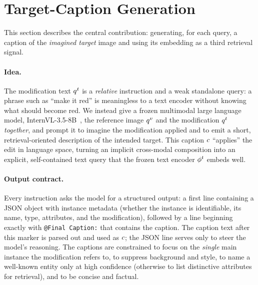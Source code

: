 \section{Target-Caption Generation}\label{sect:method_caption}

This section describes the central contribution: generating, for each query, a
caption of the \emph{imagined target} image and using its embedding as a third
retrieval signal.

\paragraph{Idea.} The modification text $q^{t}$ is a \emph{relative} instruction
and a weak standalone query: a phrase such as ``make it red'' is meaningless to
a text encoder without knowing what should become red. We instead give a frozen
multimodal large language model, InternVL-3.5-8B~\cite{wang2025internvl35}, the
reference image $q^{v}$ and the modification $q^{t}$ \emph{together}, and prompt it
to imagine the modification applied and to emit a short, retrieval-oriented
description of the intended target. This caption $c$ ``applies'' the edit in
language space, turning an implicit cross-modal composition into an explicit,
self-contained text query that the frozen text encoder $\phi^{t}$ embeds well.

\paragraph{Output contract.} Every instruction asks the model for a structured
output: a first line containing a JSON object with instance metadata (whether
the instance is identifiable, its name, type, attributes, and the modification),
followed by a line beginning exactly with \texttt{@Final Caption:} that contains
the caption. The caption text after this marker is parsed out and used as $c$;
the JSON line serves only to steer the model's reasoning. The captions are
constrained to focus on the \emph{single} main instance the modification refers
to, to suppress background and style, to name a well-known entity only at high
confidence (otherwise to list distinctive attributes for retrieval), and to be
concise and factual.

